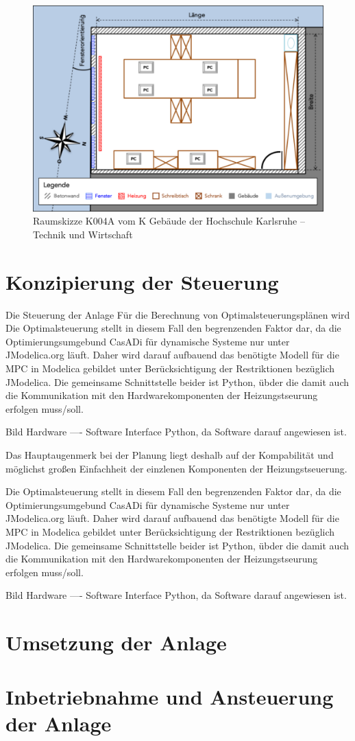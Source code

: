 \begin{figure}
\centering
\includegraphics[width=\textwidth]{abbildungen/20160102_k004a}
\caption[Raumskizze K004A vom K Gebäude der Hochschule Karlsruhe -- Technik und Wirtschaft]{Raumskizze K004A vom K Gebäude der Hochschule Karlsruhe -- Technik und Wirtschaft}
\label{fig:skizzek004a}
\end{figure}

\section{Konzipierung der Steuerung}
Die Steuerung der Anlage 
Für die Berechnung von Optimalsteuerungsplänen wird 
Die Optimalsteuerung stellt in diesem Fall den begrenzenden Faktor dar, da die Optimierungsumgebund CasADi für dynamische Systeme nur unter JModelica.org läuft. Daher wird darauf aufbauend das benötigte Modell für die MPC in Modelica gebildet unter Berücksichtigung der Restriktionen bezüglich JModelica. Die gemeinsame Schnittstelle beider ist Python, übder die damit auch die Kommunikation mit den Hardwarekomponenten der Heizungstseurung erfolgen muss/soll.

Bild Hardware ---- Software   Interface Python, da Software darauf angewiesen ist.



Das Hauptaugenmerk bei der Planung liegt deshalb auf der Kompabilität und möglichst großen Einfachheit der einzlenen Komponenten der Heizungstseuerung. 

Die Optimalsteuerung stellt in diesem Fall den begrenzenden Faktor dar, da die Optimierungsumgebund CasADi für dynamische Systeme nur unter JModelica.org läuft. Daher wird darauf aufbauend das benötigte Modell für die MPC in Modelica gebildet unter Berücksichtigung der Restriktionen bezüglich JModelica. Die gemeinsame Schnittstelle beider ist Python, übder die damit auch die Kommunikation mit den Hardwarekomponenten der Heizungstseurung erfolgen muss/soll.

Bild Hardware ---- Software   Interface Python, da Software darauf angewiesen ist.

\section{Umsetzung der Anlage}


\section{Inbetriebnahme und Ansteuerung der Anlage}
